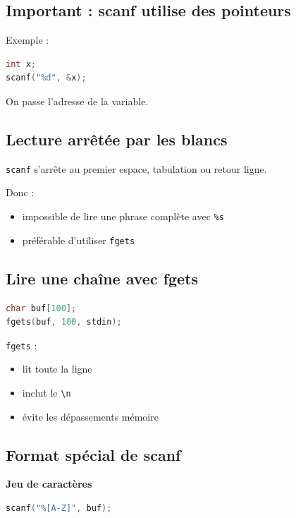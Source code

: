 \subsection{Important : scanf utilise des pointeurs}

Exemple :

\begin{lstlisting}[language=C]
int x;
scanf("%d", &x);
\end{lstlisting}

On passe l’adresse de la variable.

\subsection{Lecture arrêtée par les blancs}

\texttt{scanf} s’arrête au premier espace, tabulation ou retour ligne.

Donc :

\begin{itemize}
    \item impossible de lire une phrase complète avec \texttt{\%s}
    \item préférable d’utiliser \texttt{fgets}
\end{itemize}

\subsection{Lire une chaîne avec fgets}

\begin{lstlisting}[language=C]
char buf[100];
fgets(buf, 100, stdin);
\end{lstlisting}

\texttt{fgets} :

\begin{itemize}
    \item lit toute la ligne
    \item inclut le \texttt{\textbackslash n}
    \item évite les dépassements mémoire
\end{itemize}

\subsection{Format spécial de scanf}

\textbf{Jeu de caractères}

\begin{lstlisting}[language=C]
scanf("%[A-Z]", buf);
\end{lstlisting}

